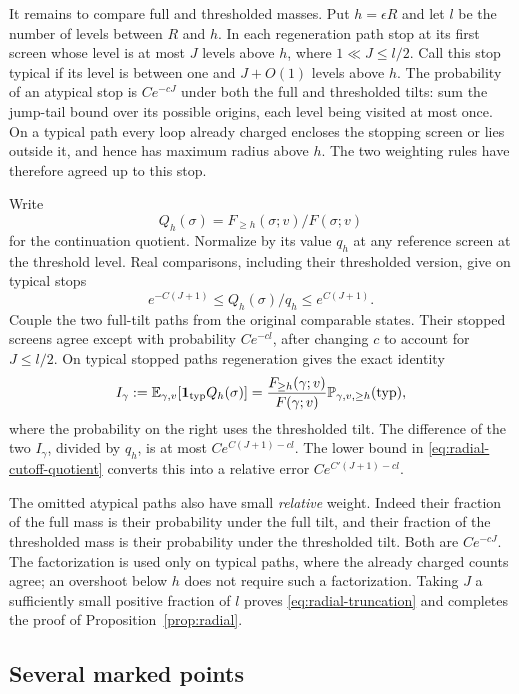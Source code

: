 It remains to compare full and thresholded masses. Put $h=\epsilon R$
and let $l$ be the number of levels between $R$ and $h$. In each
regeneration path stop at its first screen whose level is at most
$J$ levels above $h$, where $1\ll J\le l/2$. Call this stop typical
if its level is between one and $J+O(1)$ levels above $h$.
The probability of an atypical stop is $Ce^{-cJ}$ under both the
full and thresholded tilts: sum the jump-tail bound over its possible
origins, each level being visited at most once. On a typical path
every loop already charged encloses the stopping screen or lies
outside it, and hence has maximum radius above $h$. The two
weighting rules have therefore agreed up to this stop.

Write
\[
 Q_h(\sigma)=F_{\ge h}(\sigma;v)/F(\sigma;v)
\]
for the continuation quotient. Normalize by its value $q_h$ at any
reference screen at the threshold level. Real comparisons, including
their thresholded version, give on typical stops
\begin{equation}\label{eq:radial-cutoff-quotient}
 e^{-C(J+1)}\le Q_h(\sigma)/q_h\le e^{C(J+1)}.
\end{equation}
Couple the two full-tilt paths from the original comparable states.
Their stopped screens agree except with probability $Ce^{-cl}$,
after changing $c$ to account for $J\le l/2$. On typical stopped
paths regeneration gives the exact identity
\[
 I_\gamma:=\mathbb E_{\gamma,v}
       [\mathbf 1_{\mathrm{typ}}Q_h(\sigma)]
   =\frac{F_{\ge h}(\gamma;v)}{F(\gamma;v)}
            \mathbb P_{\gamma,v,\ge h}(\mathrm{typ}),
\]
where the probability on the right uses the thresholded tilt.
The difference of the two $I_\gamma$, divided by $q_h$, is
at most $Ce^{C(J+1)-cl}$. The lower bound in
\eqref{eq:radial-cutoff-quotient} converts this into a relative
error $Ce^{C'(J+1)-cl}$.

The omitted atypical paths also have small \emph{relative} weight.
Indeed their fraction of the full mass is their probability under
the full tilt, and their fraction of the thresholded mass is their
probability under the thresholded tilt. Both are $Ce^{-cJ}$.
The factorization is used only on typical paths, where the already
charged counts agree; an overshoot below $h$ does not require such
a factorization. Taking $J$ a sufficiently small positive fraction
of $l$ proves \eqref{eq:radial-truncation} and completes the proof
of Proposition~\ref{prop:radial}.

\subsection{Several marked points}

